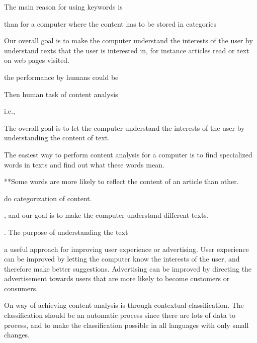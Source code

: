 
The main reason for using keywords is


than for a computer where the content has to be stored in categories


Our overall goal is to make the computer understand the interests of the user by understand texts that the user is interested in, for instance articles read or text on web pages visited. 


the performance by humans could be 

Then human task of content analysis 


i.e., 



The overall goal is to let the computer understand the interests of the user by understanding the content of text. 

The easiest way to perform content analysis for a computer is to find specialized words in texts and find out what these words mean. 

**Some words are more likely to reflect the content of an article than other. 




do categorization of content. 

, and our goal is to make the computer understand different texts. 

. The purpose of understanding the text  




a useful approach for improving user experience or advertising. User experience can be improved by letting the computer know the interests of the user, and therefore make better suggestions. Advertising can be improved by directing the advertisement towards users that are more likely to become customers or consumers. 


On way of achieving content analysis is through contextual classification.  The classification should be an automatic process since there are lots of data to process, and to make the classification possible in all languages with only small changes. 





